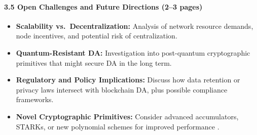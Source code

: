\documentclass[12pt]{article}
\begin{document}
\paragraph{3.5 Open Challenges and Future Directions (2--3 pages)}
\begin{itemize}
    \item \textbf{Scalability vs.\ Decentralization:} Analysis of network resource 
    demands, node incentives, and potential risk of centralization.
    \item \textbf{Quantum-Resistant DA:} Investigation into post-quantum cryptographic 
    primitives that might secure DA in the long term.
    \item \textbf{Regulatory and Policy Implications:} Discuss how data retention or 
    privacy laws intersect with blockchain DA, plus possible compliance frameworks.
    \item \textbf{Novel Cryptographic Primitives:} Consider advanced accumulators, 
    STARKs, or new polynomial schemes for improved performance \citep{liux2023}.
\end{itemize}

\bigskip


\end{document}
